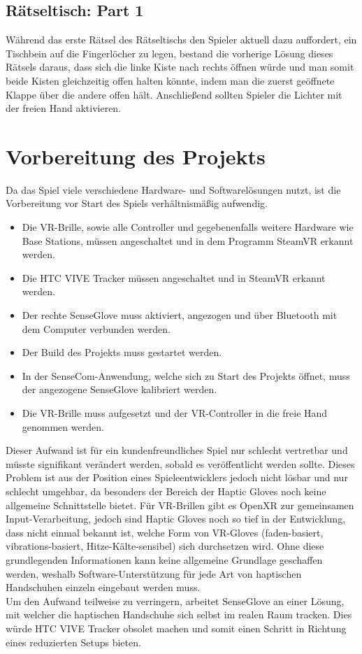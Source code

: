 \subsection{Rätseltisch: Part 1}
Während das erste Rätsel des Rätseltischs den Spieler aktuell dazu auffordert, ein Tischbein auf die Fingerlöcher zu legen, bestand die vorherige Lösung dieses Rätsels daraus, dass sich die linke Kiste nach rechts öffnen würde und man somit beide Kisten gleichzeitig offen halten könnte, indem man die zuerst geöffnete Klappe über die andere offen hält. Anschließend sollten Spieler die Lichter mit der freien Hand aktivieren. 

\newpage
\noindent
\section{Vorbereitung des Projekts}
Da das Spiel viele verschiedene Hardware- und Softwarelösungen nutzt, ist die Vorbereitung vor Start des Spiels verhältnismäßig aufwendig.

\begin{itemize}
	\item Die VR-Brille, sowie alle Controller und gegebenenfalls weitere Hardware wie \dq Base Stations\dq, müssen angeschaltet und in dem Programm SteamVR erkannt werden.
	\item Die HTC VIVE Tracker müssen angeschaltet und in SteamVR erkannt werden.
	\item Der rechte SenseGlove muss aktiviert, angezogen und über Bluetooth mit dem Computer verbunden werden.
	\item Der Build des Projekts muss gestartet werden.
	\item In der SenseCom-Anwendung, welche sich zu Start des Projekts öffnet, muss der angezogene SenseGlove kalibriert werden.
	\item Die VR-Brille muss aufgesetzt und der VR-Controller in die freie Hand genommen werden.
\end{itemize}
\noindent Dieser Aufwand ist für ein kundenfreundliches Spiel nur schlecht vertretbar und müsste signifikant verändert werden, sobald es veröffentlicht werden sollte. Dieses Problem ist aus der Position eines Spieleentwicklers jedoch nicht lösbar und nur schlecht umgehbar, da besonders der Bereich der Haptic Gloves noch keine allgemeine Schnittstelle bietet. Für VR-Brillen gibt es OpenXR zur gemeinsamen Input-Verarbeitung, jedoch sind Haptic Gloves noch so tief in der Entwicklung, dass nicht einmal bekannt ist, welche Form von VR-Gloves (faden-basiert, vibrations-basiert, Hitze-Kälte-sensibel) sich durchsetzen wird. Ohne diese grundlegenden Informationen kann keine allgemeine Grundlage geschaffen werden, weshalb Software-Unterstützung für jede Art von haptischen Handschuhen einzeln eingebaut werden muss.\\
\noindent Um den Aufwand teilweise zu verringern, arbeitet SenseGlove an einer Lösung, mit welcher die haptischen Handschuhe sich selbst im realen Raum tracken. Dies würde HTC VIVE Tracker obsolet machen und somit einen Schritt in Richtung eines reduzierten Setups bieten.

